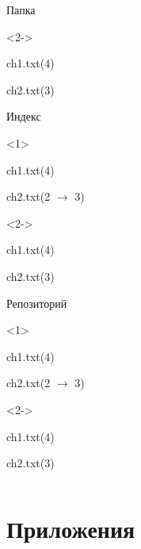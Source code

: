 \documentclass[9pt, aspectratio=1610]{beamer}
\begin{document}
\begin{frame}[t,fragile]
\begin{columns}[onlytextwidth]
\begin{column}[T]{\linewidth}
\begin{minipage}[t][3cm][t]{\linewidth}
\begin{minipage}[t]{0.29\linewidth}
\begin{exampleblock}{Папка\strut}
						\begin{onlyenv}<2->
							\strut ch1.txt(4)
							\strut ch2.txt(3)
						\end{onlyenv}
						
						
					\end{exampleblock}
				\end{minipage}\hfill%
				\begin{minipage}[t]{0.29\textwidth}
					\begin{exampleblock}{Индекс\strut}    %
						
						
						\begin{onlyenv}<1>
							\strut ch1.txt(4)
							\strut ch2.txt(2 $\to$ 3)							
						\end{onlyenv}%
						
						\begin{onlyenv}<2->
							\strut ch1.txt(4)
							\strut ch2.txt(3)							
						\end{onlyenv}%
						
					\end{exampleblock}
				\end{minipage}\hfill%
				\begin{minipage}[t]{0.29\textwidth}
					\begin{exampleblock}{Репозиторий\strut}      %
						
						\begin{onlyenv}<1>
							\strut ch1.txt(4)
							\strut ch2.txt(2 $\to$ 3)
						\end{onlyenv}	
						
						\begin{onlyenv}<2->
							\strut ch1.txt(4)
							\strut ch2.txt(3)
						\end{onlyenv}					
						
					\end{exampleblock}
				\end{minipage}\hfill%
			\end{minipage}		
			
		\end{column}
	\end{columns}
	
	
	
	
\end{frame}




\section*{Приложения}
\end{document}
